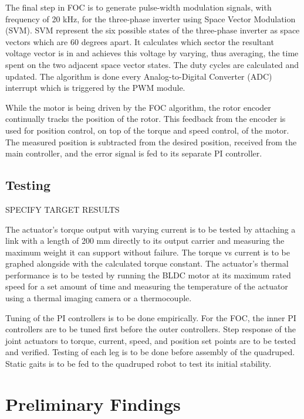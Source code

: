 \documentclass[english]{upeeei}
\begin{document}
The final step in FOC is to generate pulse-width modulation signals, with frequency of 20 kHz, for the three-phase inverter using Space Vector Modulation (SVM). SVM represent the six possible states of the three-phase inverter as space vectors which are 60 degrees apart. It calculates which sector the resultant voltage vector is in and achieves this voltage by varying, thus averaging, the time spent on the two adjacent space vector states. The duty cycles are calculated and updated. The algorithm is done every Analog-to-Digital Converter (ADC) interrupt which is triggered by the PWM module.

While the motor is being driven by the FOC algorithm, the rotor encoder continually tracks the position of the rotor. This feedback from the encoder is used for position control, on top of the torque and speed control, of the motor. The measured position is subtracted from the desired position, received from the main controller, and the error signal is fed to its separate PI controller. 

\section{Testing}

SPECIFY TARGET RESULTS

The actuator's torque output with varying current is to be tested by attaching a link with a length of 200 mm directly to its output carrier and measuring the maximum weight it can support without failure. The torque vs current is to be graphed alongside with the calculated torque constant. The actuator's thermal performance is to be tested by running the BLDC motor at its maximum rated speed for a set amount of time and measuring the temperature of the actuator using a thermal imaging camera or a thermocouple.

Tuning of the PI controllers is to be done empirically. For the FOC, the inner PI controllers are to be tuned first before the outer controllers. Step response of the joint actuators to torque, current, speed, and position set points are to be tested and verified. Testing of each leg is to be done before assembly of the quadruped. Static gaits is to be fed to the quadruped robot to test its initial stability.

\cleardoublepage{}
\chapter{Preliminary Findings\label{cha:Prelims}}
\end{document}
